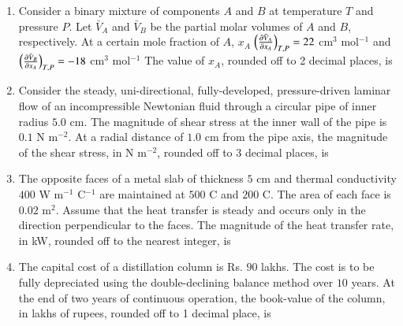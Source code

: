 \documentclass[journal,12pt,onecolumn]{IEEEtran}
\theoremstyle{remark}
\begin{document}
\begin{enumerate}
		\hfill{}
		
		\item Consider a binary mixture of components $A$ and $B$ at temperature $T$ and pressure $P$. Let $\bar{V}_A$ and $\bar{V}_B$ be the partial molar volumes of $A$ and $B$, respectively. At a certain mole fraction of $A$, $x_A$ $\left(\frac{\partial \bar{V}_A}{\partial x_A}\right)_{T,P} = 22$ cm$^3$ mol$^{-1}$ and $\left(\frac{\partial \bar{V}_B}{\partial x_A}\right)_{T,P} = -18$ cm$^3$ mol$^{-1}$ The value of $x_A$, rounded off to 2 decimal places, is \underline{\hspace{2cm}}
		
		\hfill{}
		
		\item Consider the steady, uni-directional, fully-developed, pressure-driven laminar flow of an incompressible Newtonian fluid through a circular pipe of inner radius $5.0$ cm. The magnitude of shear stress at the inner wall of the pipe is $0.1$ N m$^{-2}$. At a radial distance of $1.0$ cm from the pipe axis, the magnitude of the shear stress, in N m$^{-2}$, rounded off to 3 decimal places, is \underline{\hspace{2cm}}
		
		\hfill{}
		
		\item The opposite faces of a metal slab of thickness $5$ cm and thermal conductivity $400$ W m$^{-1}$ \degree C$^{-1}$ are maintained at $500$ \degree C and $200$ \degree C. The area of each face is $0.02$ m$^2$. Assume that the heat transfer is steady and occurs only in the direction perpendicular to the faces. The magnitude of the heat transfer rate, in kW, rounded off to the nearest integer, is \underline{\hspace{2cm}}
		
		\hfill{}
		
		\item The capital cost of a distillation column is Rs. $90$ lakhs. The cost is to be fully depreciated  using the double-declining balance method over $10$ years. At the end of two years of continuous operation, the book-value of the column, in lakhs of rupees, rounded off to 1 decimal place, is \underline{\hspace{2cm}}
		
		\hfill{}
		

\end{enumerate}
\end{document}
